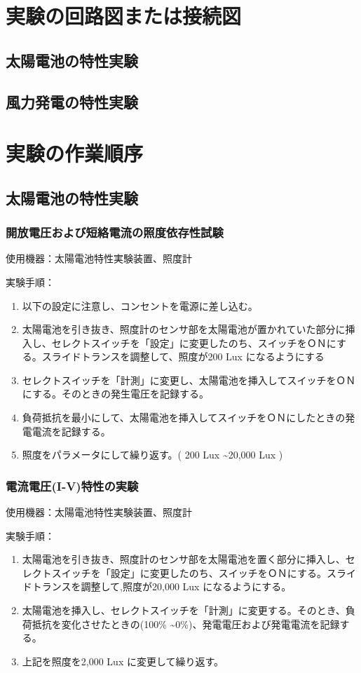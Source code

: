 \documentclass[a4paper,11pt,xelatex,ja=standard]{bxjsarticle}
\begin{document}
\section{実験の回路図または接続図}
    \subsection{太陽電池の特性実験}
    \subsection{風力発電の特性実験}
\section{実験の作業順序}
    \subsection{太陽電池の特性実験}
        \subsubsection{開放電圧および短絡電流の照度依存性試験}
            使用機器：太陽電池特性実験装置、照度計

            実験手順：
            \begin{enumerate}
                \item 以下の設定に注意し、コンセントを電源に差し込む。
                \item 太陽電池を引き抜き、照度計のセンサ部を太陽電池が置かれていた部分に挿入し、セレクトスイッチを「設定」に変更したのち、スイッチをＯＮにする。スライドトランスを調整して、照度が200 Lux になるようにする
                \item セレクトスイッチを「計測」に変更し、太陽電池を挿入してスイッチをＯＮにする。そのときの発生電圧を記録する。
                \item 負荷抵抗を最小にして、太陽電池を挿入してスイッチをＯＮにしたときの発電電流を記録する。
                \item 照度をパラメータにして繰り返す。( 200 Lux \textasciitilde 20,000 Lux )
            \end{enumerate}
        \subsubsection{電流電圧(I-V)特性の実験}
            使用機器：太陽電池特性実験装置、照度計

            実験手順：
            \begin{enumerate}
                \item 太陽電池を引き抜き、照度計のセンサ部を太陽電池を置く部分に挿入し、セレクトスイッチを「設定」に変更したのち、スイッチをＯＮにする。スライドトランスを調整して,照度が20,000 Lux になるようにする。
                \item 太陽電池を挿入し、セレクトスイッチを「計測」に変更する。そのとき、負荷抵抗を変化させたときの(100\% \textasciitilde 0\%)、発電電圧および発電電流を記録する。
                \item 上記を照度を2,000 Lux に変更して繰り返す。
            \end{enumerate}
\end{document}
